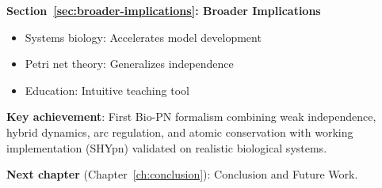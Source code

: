 \textbf{Section~\ref{sec:broader-implications}: Broader Implications}
\begin{itemize}
    \item Systems biology: Accelerates model development
    \item Petri net theory: Generalizes independence
    \item Education: Intuitive teaching tool
\end{itemize}

\textbf{Key achievement}: First Bio-PN formalism combining weak independence, hybrid dynamics, arc regulation, and atomic conservation with working implementation (SHYpn) validated on realistic biological systems.

\textbf{Next chapter} (Chapter~\ref{ch:conclusion}): Conclusion and Future Work.

